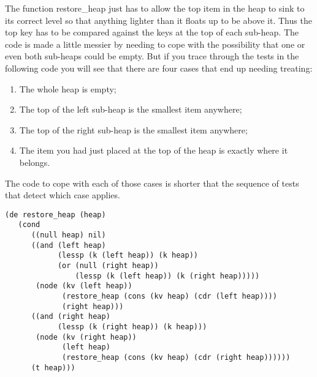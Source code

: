The function {\tx restore\_heap} just has to allow the top item in the
heap to sink to its correct level so that anything lighter than it
floats up to be above it. Thus the top key has to be compared against the
keys at the top of each sub-heap. The code is made a little messier by needing
to cope with the possibility that one or even both sub-heaps could be empty.
But if you trace through the tests in the following code you will see that there
are four cases that end up needing treating:
\begin{enumerate}
\item The whole heap is empty;
\item The top of the left sub-heap is the smallest item anywhere;
\item The top of the right sub-heap is the smallest item anywhere;
\item The item you had just placed at the top of the heap is
exactly where it belongs.
\end{enumerate}
The code to cope with each of those cases is shorter that the sequence
of tests that detect which case applies.
{\small\begin{verbatim}
(de restore_heap (heap)
   (cond
      ((null heap) nil)
      ((and (left heap)
            (lessp (k (left heap)) (k heap))
            (or (null (right heap))
                (lessp (k (left heap)) (k (right heap)))))
       (node (kv (left heap))
             (restore_heap (cons (kv heap) (cdr (left heap))))
             (right heap)))
      ((and (right heap)
            (lessp (k (right heap)) (k heap)))
       (node (kv (right heap))
             (left heap)
             (restore_heap (cons (kv heap) (cdr (right heap))))))
      (t heap)))
\end{verbatim}}

